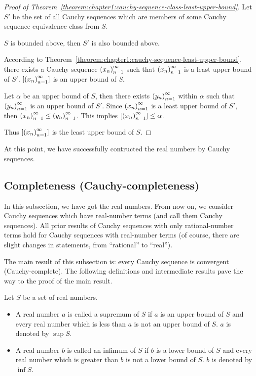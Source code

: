 \begin{proof}[Proof of Theorem~\ref{theorem:chapter1:cauchy-sequence-class-least-upper-bound}]
    Let $S'$ be the set of all Cauchy sequences which are members of some Cauchy sequence equivalence class from $S$.

    $S$ is bounded above, then $S'$ is also bounded above.

    According to Theorem~\ref{theorem:chapter1:cauchy-sequence-least-upper-bound}, there exists a Cauchy sequence ${\left({x_{n}}\right)}^{\infty}_{n=1}$ such that ${\left({x_{n}}\right)}^{\infty}_{n=1}$ is a least upper bound of $S'$. $\left[{{\left({x_{n}}\right)}^{\infty}_{n=1}}\right]$ is an upper bound of $S$.

    Let $\alpha$ be an upper bound of $S$, then there exists ${\left({y_{n}}\right)}^{\infty}_{n=1}$ within $\alpha$ such that ${\left({y_{n}}\right)}^{\infty}_{n=1}$ is an upper bound of $S'$. Since ${\left({x_{n}}\right)}^{\infty}_{n=1}$ is a least upper bound of $S'$, then ${\left({x_{n}}\right)}^{\infty}_{n=1} \le {\left({y_{n}}\right)}^{\infty}_{n=1}$. This implies $\left[{{\left({x_{n}}\right)}^{\infty}_{n=1}}\right] \le \alpha$.

    Thus $\left[{{\left({x_{n}}\right)}^{\infty}_{n=1}}\right]$ is the least upper bound of $S$.
\end{proof}

At this point, we have successfully contructed the real numbers by Cauchy sequences.

\subsection{Completeness (Cauchy-completeness)}

In this subsection, we have got the real numbers. From now on, we consider Cauchy sequences which have real-number terms (and call them Cauchy sequences). All prior results of Cauchy sequences with only rational-number terms hold for Cauchy sequences with real-number terms (of course, there are slight changes in statements, from ``rational'' to ``real'').

The main result of this subsection is: every Cauchy sequence is convergent (Cauchy-complete). The following definitions and intermediate results pave the way to the proof of the main result.

\begin{definition}
    Let $S$ be a set of real numbers.
    \begin{itemize}
        \item A real number $a$ is called a supremum of $S$ if $a$ is an upper bound of $S$ and every real number which is less than $a$ is not an upper bound of $S$. $a$ is denoted by $\sup S$.
        \item A real number $b$ is called an infimum of $S$ if $b$ is a lower bound of $S$ and every real number which is greater than $b$ is not a lower bound of $S$. $b$ is denoted by $\inf S$.
    \end{itemize}
\end{definition}

